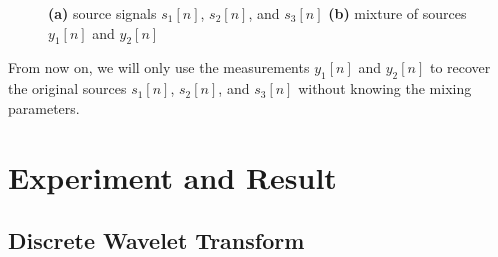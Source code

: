 \documentclass[a4paper,11pt]{article}
\begin{document}
\begin{figure}[H]
\centering
{}
\centering
{}
\caption{\textbf{(a)} source signals $s_1[n]$, $s_2[n]$, and $s_3[n]$ \; \textbf{(b)} mixture of sources $y_1[n]$ and $y_2[n]$}
\label{fig:long}
\label{fig:onecol}
\end{figure}

\noindent From now on, we will only use the measurements $y_1[n]$ and $y_2[n]$ to recover the original sources $s_1[n]$, $s_2[n]$, and $s_3[n]$ without knowing the mixing parameters.





\section{Experiment and Result}
\newcommand{\dottedcolumn}[3]{%
  \settowidth{\dimen0}{$#1$}
  \settowidth{\dimen2}{$#2$}
  \ifdim\dimen2>\dimen0 \dimen0=\dimen2 \fi
  \begin{pmatrix}\,
    \vcenter{
      \kern.6ex
      \vbox to \dimexpr#1\normalbaselineskip-1.2ex{
        \hbox{$#2$}
    \kern3pt
    \xleaders\vbox{\hbox to \dimen0{\hss.\hss}\vskip4pt}\vfill
    \kern1pt
    \hbox{$#3$}
  }\kern.6ex}\,
  \end{pmatrix}
}

\subsection{Discrete Wavelet Transform}
\end{document}
